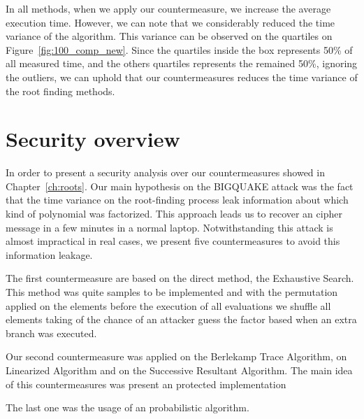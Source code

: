 

In all methods, when we apply our countermeasure, we increase the average execution time. However, we can note that we considerably reduced the time variance of the algorithm. This variance can be observed on the quartiles on Figure~\ref{fig:100_comp_new}. Since the quartiles inside the box represents 50\% of all measured time, and the others quartiles represents the remained 50\%, ignoring the outliers, we can uphold that our countermeasures reduces the time variance of the root finding methods. 

\section{Security overview}
In order to present a security analysis over our countermeasures showed in Chapter~\ref{ch:roots}. Our main hypothesis on the BIGQUAKE attack was the fact that the time variance on the root-finding process leak information about which kind of polynomial was factorized. This approach leads us to recover an cipher message in a few minutes in a normal laptop. Notwithstanding this attack is almost impractical in real cases, we present five countermeasures to avoid this information leakage.

The first countermeasure are based on the direct method, the Exhaustive Search. This method was quite samples to be implemented and with the permutation applied on the elements before the execution of all evaluations we shuffle all elements taking of the chance of an attacker guess the factor based when an extra branch was executed.

Our second countermeasure was applied on the Berlekamp Trace Algorithm, on Linearized Algorithm and on the Successive Resultant Algorithm. The main idea of this countermeasures was present an protected implementation 

The last one was the usage of an probabilistic algorithm. 




